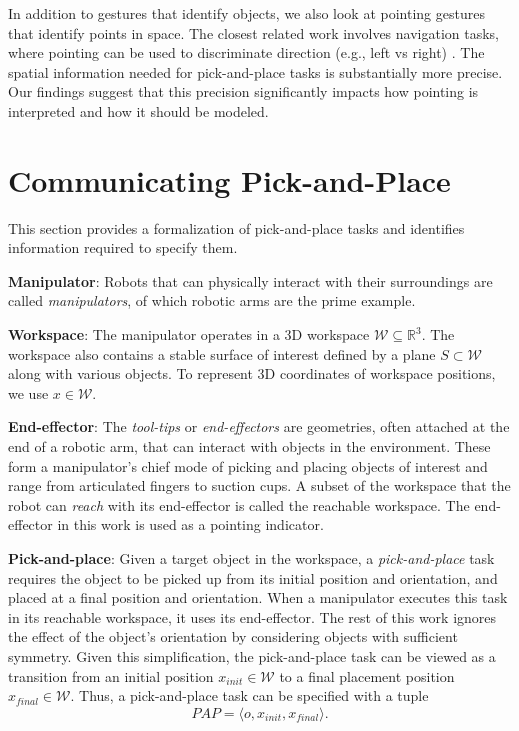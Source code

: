 \documentclass[letterpaper]{article} %
\newcommand{\xinit}{\ensuremath{x_{\textit{init}}}}
\newcommand{\xfinal}{\ensuremath{x_{\textit{final}}}}
\begin{document}
In addition to gestures that identify objects, we also look at pointing gestures that identify points in space. The closest related work involves navigation tasks, where pointing can be used to discriminate direction (e.g., left vs right) \cite{mei2016listen,tellex2011understanding}. The spatial information needed for pick-and-place tasks is substantially more precise. Our findings suggest that this precision significantly impacts how pointing is interpreted and how it should be modeled.




\section{Communicating Pick-and-Place}
\label{problem}

This section provides a formalization of pick-and-place tasks and identifies information required to specify them.
 
\noindent\textbf{Manipulator}: Robots that can physically interact with their surroundings are called \textit{manipulators}, of which robotic arms are the prime example. 

\noindent\textbf{Workspace}: The manipulator operates in a 3D workspace $\mathcal{W} \subseteq \mathbb{R}^3$. The workspace also contains a stable surface of interest defined by a plane $S\subset\mathcal{W}$ along with various objects. To represent 3D coordinates of workspace positions, we use $x\in\mathcal{W}$. 

\noindent\textbf{End-effector}: The \textit{tool-tips} or \textit{end-effectors} are geometries, often attached at the end of a robotic arm, that can interact with objects in the environment. These form a manipulator's chief mode of picking and placing objects of interest and range from articulated fingers to suction cups. A subset of the workspace that the robot can \textit{reach} with its end-effector is called the reachable workspace. The end-effector in this work is used as a pointing indicator.

\noindent\textbf{Pick-and-place}: Given a target object in the workspace, a \textit{pick-and-place} task requires the object to be picked up from its initial position and orientation, and placed at a final position and orientation. When a manipulator executes this task in its reachable workspace, it uses its end-effector. 
The rest of this work ignores the effect of the object's orientation by considering objects with sufficient symmetry. Given this simplification, the pick-and-place task can be viewed as a transition from an initial position $\xinit\in\mathcal{W}$ to a final placement position $\xfinal\in\mathcal{W}$.  Thus, a pick-and-place task can be specified with a tuple
$$ \textit{PAP} = \langle o, \xinit, \xfinal \rangle. $$
\end{document}
